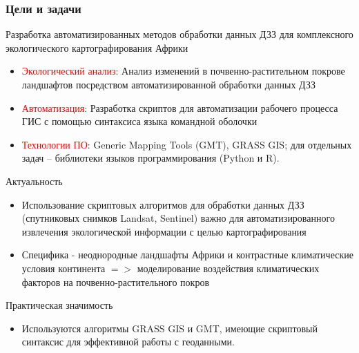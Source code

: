 \documentclass[pdflatex,compress,8pt,
	xcolor={dvipsnames,dvipsnames,svgnames,x11names,table},
	hyperref={colorlinks = true, breaklinks = true, urlcolor = NavyBlue, linkcolor=white, breaklinks = true}]{beamer}
\begin{document}
\begin{frame}\frametitle{Цели и задачи}
\vspace{-1em}
\begin{alertblock}{Разработка автоматизированных методов обработки данных ДЗЗ для комплексного экологического картографирования Африки}
\begin{itemize}
	\item \textcolor{red}{Экологический анализ}: Анализ изменений в почвенно-растительном покрове ландшафтов посредством автоматизированной обработки данных ДЗЗ
	\item \textcolor{red}{Автоматизация}: Разработка скриптов для автоматизации рабочего процесса ГИС с помощью синтаксиса языка командной оболочки 
	\item \textcolor{red}{Технологии ПО}: Generic Mapping Tools (GMT), GRASS GIS; для отдельных задач -- библиотеки языков программирования (Python и R).
\end{itemize}
\end{alertblock}

\begin{exampleblock}{Актуальность}
\begin{itemize}
        	\item Использование скриптовых алгоритмов для обработки данных ДЗЗ (спутниковых снимков Landsat, Sentinel) важно для автоматизированного извлечения экологической информации с целью картографирования 
	\item Специфика - неоднородные ландшафты Африки и контрастные климатические условия континента $=>$   моделирование воздействия климатических факторов на почвенно-растительного покров
\end{itemize}
\end{exampleblock}
	
\begin{alertblock}{Практическая значимость}
\begin{itemize}
	\item Используются алгоритмы GRASS GIS и GMT, имеющие скриптовый синтаксис для эффективной работы с геоданными.
\end{itemize}
\end{alertblock}
\end{frame}
\end{document}
